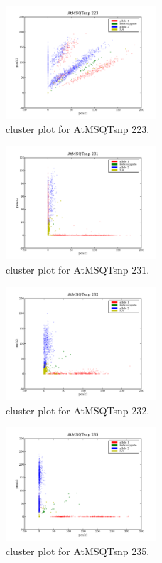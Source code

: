 \begin{figure}[H]
\includegraphics[width=0.5\textwidth]{figures/cluster_plot_AtMSQTsnp_223.png}
\caption{cluster plot for AtMSQTsnp 223.} \label{flAtMSQTsnp223}
\end{figure}

\begin{figure}[H]
\includegraphics[width=0.5\textwidth]{figures/cluster_plot_AtMSQTsnp_231.png}
\caption{cluster plot for AtMSQTsnp 231.} \label{flAtMSQTsnp231}
\end{figure}

\begin{figure}[H]
\includegraphics[width=0.5\textwidth]{figures/cluster_plot_AtMSQTsnp_232.png}
\caption{cluster plot for AtMSQTsnp 232.} \label{flAtMSQTsnp232}
\end{figure}

\begin{figure}[H]
\includegraphics[width=0.5\textwidth]{figures/cluster_plot_AtMSQTsnp_235.png}
\caption{cluster plot for AtMSQTsnp 235.} \label{flAtMSQTsnp235}
\end{figure}

